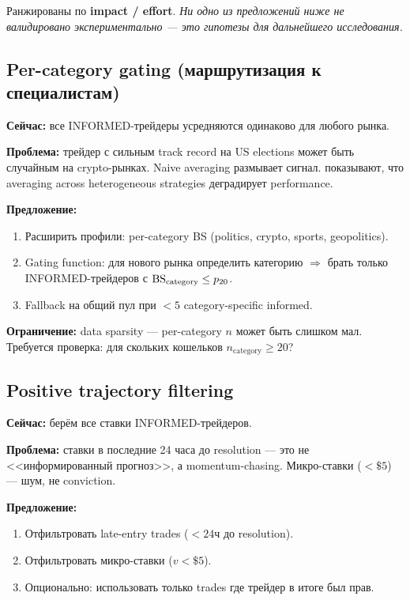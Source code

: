 Ранжированы по \textbf{impact / effort}.
\emph{Ни одно из предложений ниже не валидировано экспериментально ---
это гипотезы для дальнейшего исследования.}

\subsection{Per-category gating (маршрутизация к специалистам)}
\label{sec:gating}

\textbf{Сейчас:} все INFORMED-трейдеры усредняются одинаково для любого рынка.

\textbf{Проблема:} трейдер с сильным track record на US elections может быть
случайным на crypto-рынках. Naive averaging размывает сигнал.
\citet{dibm2025} показывают, что averaging across heterogeneous strategies
деградирует performance.

\textbf{Предложение:}
\begin{enumerate}[nosep]
  \item Расширить профили: per-category BS (politics, crypto, sports, geopolitics).
  \item Gating function: для нового рынка определить категорию $\Rightarrow$
    брать только INFORMED-трейдеров с $\mathrm{BS}_{\mathrm{category}} \leq p_{20}$.
  \item Fallback на общий пул при $<5$ category-specific informed.
\end{enumerate}

\textbf{Ограничение:} data sparsity --- per-category $n$ может быть слишком мал.
Требуется проверка: для скольких кошельков $n_{\mathrm{category}} \geq 20$?

\subsection{Positive trajectory filtering}

\textbf{Сейчас:} берём все ставки INFORMED-трейдеров.

\textbf{Проблема:} ставки в последние 24 часа до resolution ---
это не <<информированный прогноз>>, а momentum-chasing.
Микро-ставки ($< \$5$) --- шум, не conviction.

\textbf{Предложение:}
\begin{enumerate}[nosep]
  \item Отфильтровать late-entry trades ($< 24$ч до resolution).
  \item Отфильтровать микро-ставки ($v < \$5$).
  \item Опционально: использовать только trades где трейдер в итоге был прав.
\end{enumerate}

